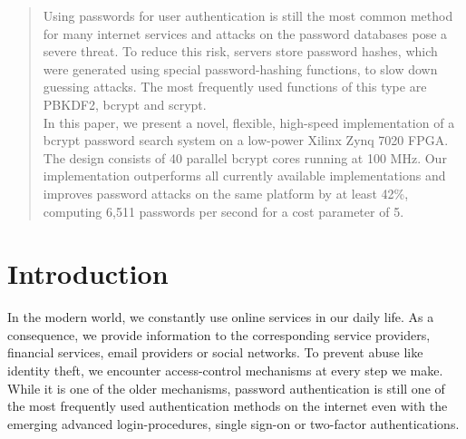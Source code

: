 
\begin{abstract}
Using passwords for user authentication is still the most common method for many
internet services and attacks on the password databases pose a severe threat. To
reduce this risk, servers store password hashes, which were generated using
special password-hashing functions, to slow down guessing attacks. The most
frequently used functions of this type are PBKDF2, bcrypt and scrypt.\\
%
In this paper, we present a novel, flexible, high-speed implementation of a
bcrypt password search system on a low-power Xilinx Zynq 7020 FPGA. The design
consists of 40 parallel bcrypt cores running at 100 MHz. Our implementation
outperforms all currently available implementations and improves password
attacks on the same platform by at least 42\%, computing 6,511 passwords per
second for a cost parameter of 5.
%
\end{abstract}

\section{Introduction}
\label{sec:intro}

In the modern world, we constantly use online services in our daily life. As a
consequence, we provide information to the corresponding service providers,
\eg financial services, email providers or social networks. To prevent abuse
like identity theft, we encounter access-control mechanisms at every step we
make. While it is one of the older mechanisms, password authentication is still
one of the most frequently used authentication methods on the internet even
with the emerging advanced login-procedures, \eg single sign-on or two-factor
authentications.

